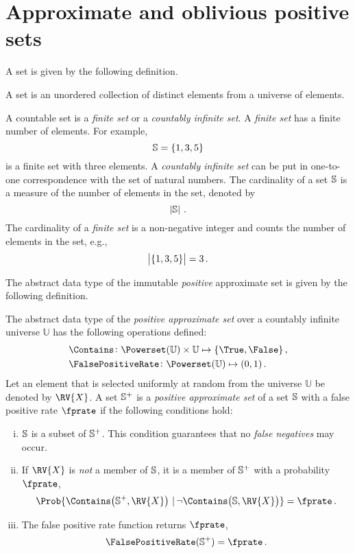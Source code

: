 \documentclass[ ../main.tex]{subfiles}
\begin{document}
\section{Approximate and oblivious positive sets}
A set is given by the following definition.
\begin{definition}
A set is an unordered collection of distinct elements from a universe of elements.
\end{definition}
A countable set is a \emph{finite set} or a \emph{countably infinite set}. A \emph{finite set} has a finite number of elements. For example,
\[
    \mathbb{S} = \{ 1, 3, 5 \}
\]
is a finite set with three elements. A \emph{countably infinite set} can be put in one-to-one correspondence with the set of natural numbers. The cardinality of a set $\mathbb{S}$ is a measure of the number of elements in the set, denoted by
\begin{equation}
    \left\vert{\mathbb{\mathbb{S}}}\right\vert\,.
\end{equation}
The cardinality of a \emph{finite set} is a non-negative integer and counts the number of elements in the set, e.g.,
\[
    \left\vert{\left\{ 1, 3, 5\right\}}\right\vert = 3\,.
\]

The abstract data type of the immutable \emph{positive} approximate set\cite{aset} is given by the following definition.
\begin{definition}
\label{def:approx_set}
The abstract data type of the \emph{positive approximate set} over a countably infinite universe $\mathbb{U}$ has the following operations defined:
\begin{align}
    &\Contains \colon \Powerset(\mathbb{U}) \times \mathbb{U} \mapsto \{ \True, \False \}\,,\\
    &\FalsePositiveRate \colon \Powerset(\mathbb{U}) \mapsto (0,1)\,.
\end{align}
Let an element that is selected uniformly at random from the universe $\mathbb{U}$ be denoted by $\RV{X}$. A set $\mathbb{S}^+$ is a \emph{positive approximate set} of a set $\mathbb{S}$ with a false positive rate $\fprate$ if the following conditions hold:
\begin{enumerate}[(i)]
    \item $\mathbb{S}$ is a subset of $\mathbb{S}^+$. This condition guarantees that no \emph{false negatives} may occur.
    \item If $\RV{X}$ is \emph{not} a member of $\mathbb{S}$, it is a member of $\mathbb{S}^+$ with a probability $\fprate$,
    \begin{equation}
        \Prob{\Contains\!\left(\Sp,\RV{X}\right) \given \neg \Contains\!\left(\St,\RV{X}\right)} = \fprate\,.
    \end{equation}
    \item The false positive rate function returns $\fprate$,
    \begin{equation}
         \FalsePositiveRate(\Sp) = \fprate\,.
    \end{equation}
\end{enumerate}
\end{definition}
\end{document}
